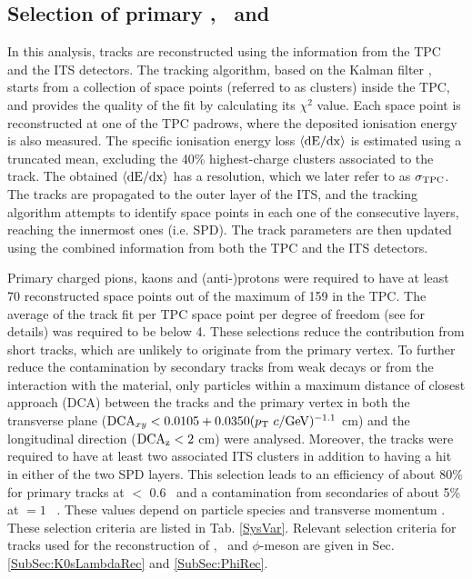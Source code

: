 \subsection{Selection of primary \pion, \kaon~and \proton}
\label{SubSec:Track}
In this analysis, tracks are reconstructed using the information from the TPC and the ITS detectors. The tracking algorithm, based on the Kalman filter \cite{Billoir:1983mz,Billoir:1985nq}, starts from a collection of space points (referred to as clusters) inside the TPC, and provides the quality of the fit by calculating its $\chi^{2}$ value. Each space point is reconstructed at one of the TPC padrows, where the deposited ionisation energy is also measured. The specific ionisation energy loss $\langle{\rm{dE}/dx}\rangle$ is estimated using a truncated mean, excluding the 40\% highest-charge clusters associated to the track. The obtained $\langle{\rm{dE}/dx}\rangle$ has a resolution, which we later refer to as $\sigma_{\rm{TPC}}$. The tracks are propagated to the outer layer of the ITS, and the tracking algorithm attempts to identify space points in each one of the consecutive layers, reaching the innermost ones (i.e. SPD). The track parameters are then updated using the combined information from both the TPC and the ITS detectors. 

Primary charged pions, kaons and (anti-)protons were required to have at least 70 reconstructed space points out of the maximum of 159 in the TPC. The average of the track fit per TPC space point per degree of freedom (see \cite{Abelev:2014ffa} for details) was required to be below 4. These selections reduce the contribution from short tracks, which are unlikely to originate from the primary vertex. To further reduce the contamination by secondary tracks from weak decays or from the interaction with the material, only particles within a maximum distance of closest approach (DCA) between the tracks and the primary vertex in both the transverse plane (${\rm{DCA}}_{xy} < 0.0105 + 0.0350(p_{\rm{T}}~c/{\rm{GeV}})^{-1.1}$ cm) and the longitudinal direction ($\rm{DCA}_{z} < 2$ cm) were analysed. Moreover, the tracks were required to have at least two associated ITS clusters in addition to having a hit in either of the two SPD layers. This selection leads to an efficiency of about 80\% for primary tracks at \pT$ < $ 0.6 \GeV~and a contamination from secondaries of about 5\% at \pT $= 1$ \GeV~\cite{Abelev:2013vea}. These values depend on particle species and transverse momentum \cite{Abelev:2013vea}. These selection criteria are listed in Tab. \ref{SysVar}. Relevant selection criteria for tracks used for the reconstruction of \Ks, \lambdas~and $\phi$-meson are given in Sec. \ref{SubSec:K0sLambdaRec} and \ref{SubSec:PhiRec}.

